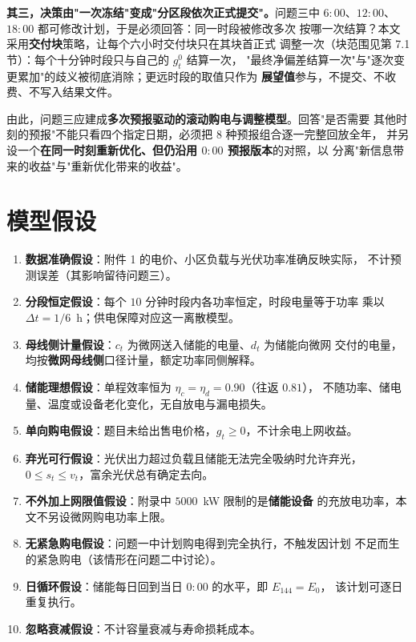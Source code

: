 \documentclass[withoutpreface,bwprint]{cumcmthesis}
\begin{document}
\textbf{其三，决策由"一次冻结"变成"分区段依次正式提交"。}问题三中
$6{:}00$、$12{:}00$、$18{:}00$ 都可修改计划，于是必须回答：同一时段被修改多次
按哪一次结算？本文采用\textbf{交付块}策略，让每个六小时交付块只在其块首正式
调整一次（块范围见第 7.1 节）：每个十分钟时段只与自己的 $g_t^0$ 结算一次，
"最终净偏差结算一次"与"逐次变更累加"的歧义被彻底消除；更远时段的取值只作为
\textbf{展望值}参与，不提交、不收费、不写入结果文件。

由此，问题三应建成\textbf{多次预报驱动的滚动购电与调整模型}。回答"是否需要
其他时刻的预报"不能只看四个指定日期，必须把 $8$ 种预报组合逐一完整回放全年，
并另设一个\textbf{在同一时刻重新优化、但仍沿用 $0{:}00$ 预报版本}的对照，以
分离"新信息带来的收益"与"重新优化带来的收益"。

\section{模型假设}

\begin{enumerate}
  \item \textbf{数据准确假设}：附件 1 的电价、小区负载与光伏功率准确反映实际，
        不计预测误差（其影响留待问题三）。
  \item \textbf{分段恒定假设}：每个 $10$ 分钟时段内各功率恒定，时段电量等于功率
        乘以 $\Delta t = 1/6$~h；供电保障对应这一离散模型。
  \item \textbf{母线侧计量假设}：$c_t$ 为微网送入储能的电量、$d_t$ 为储能向微网
        交付的电量，均按\textbf{微网母线侧}口径计量，额定功率同侧解释。
  \item \textbf{储能理想假设}：单程效率恒为 $\eta_c=\eta_d=0.90$（往返 $0.81$），
        不随功率、储电量、温度或设备老化变化，无自放电与漏电损失。
  \item \textbf{单向购电假设}：题目未给出售电价格，$g_t \ge 0$，不计余电上网收益。
  \item \textbf{弃光可行假设}：光伏出力超过负载且储能无法完全吸纳时允许弃光，
        $0 \le s_t \le v_t$，富余光伏总有确定去向。
  \item \textbf{不外加上网限值假设}：附录中 $5000$~kW 限制的是\textbf{储能设备}
        的充放电功率，本文不另设微网购电功率上限。
  \item \textbf{无紧急购电假设}：问题一中计划购电得到完全执行，不触发因计划
        不足而生的紧急购电（该情形在问题二中讨论）。
  \item \textbf{日循环假设}：储能每日回到当日 $0{:}00$ 的水平，即 $E_{144}=E_0$，
        该计划可逐日重复执行。
  \item \textbf{忽略衰减假设}：不计容量衰减与寿命损耗成本。
\end{enumerate}
\end{document}
